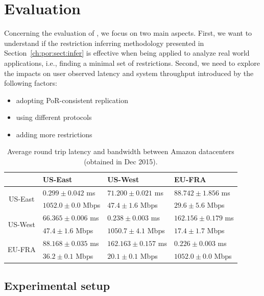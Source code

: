 \section{Evaluation}
\label{ch:por:sect:eval}

Concerning the evaluation of \coordtool, we focus on two main
aspects. First, we want to understand if the restriction inferring
methodology presented in Section~\ref{ch:por:sect:infer} is effective when being applied to
analyze real world applications, i.e., finding a minimal set of restrictions. 
Second, we need to explore the impacts on user observed latency and system throughput
introduced by the following factors: 

\begin{itemize}
\item adopting PoR-consistent replication
\item using different protocols
\item adding more restrictions
\end{itemize}




\begin{table}[t]
\centering
\scriptsize
 \begin{tabular}{c|l|l|l|}
 & US-East & US-West & EU-FRA \\
\hline
\multirow{2}{*}{US-East} &  $0.299\pm0.042$  ms  & $71.200\pm0.021$ ms    & $88.742\pm1.856$ ms  \\
   &  $1052.0\pm0.0$ Mbps& $47.4\pm1.6$ Mbps & $29.6\pm5.6$ Mbps \\
\hline
\multirow{2}{*}{US-West} &    $66.365\pm0.006$ ms    & $0.238\pm0.003$ ms   & $162.156\pm0.179$ ms \\
   &   $47.4\pm1.6$ Mbps      & $1050.7\pm4.1$ Mbps & $17.4\pm1.7$ Mbps  \\
\hline
\multirow{2}{*}{EU-FRA} &   $88.168\pm0.035$ ms     &   $162.163\pm0.157$ ms   & $0.226\pm0.003$ ms  \\
   &    $36.2\pm0.1$ Mbps     &     $20.1\pm0.1$ Mbps     & $1052.0\pm0.0$ Mbps \\
\hline
\end{tabular}
\caption{Average round trip latency and bandwidth between Amazon datacenters (obtained in Dec 2015).}
\label{tab:por:roundtriplatency}
\end{table}


\subsection{Experimental setup}
